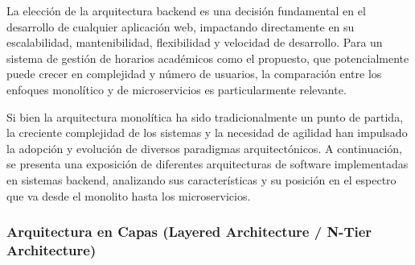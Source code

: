 La elección de la arquitectura backend es una decisión fundamental en el desarrollo de cualquier aplicación web, impactando directamente en su escalabilidad, mantenibilidad, flexibilidad y velocidad de desarrollo. Para un sistema de gestión de horarios académicos como el propuesto, que potencialmente puede crecer en complejidad y número de usuarios, la comparación entre los enfoques monolítico y de microservicios es particularmente relevante.

Si bien la arquitectura monolítica ha sido tradicionalmente un punto de partida, la creciente complejidad de los sistemas y la necesidad de agilidad han impulsado la adopción y evolución de diversos paradigmas arquitectónicos. A continuación, se presenta una exposición de diferentes arquitecturas de software \cite{bookORellySoftwareArchitecture} implementadas en sistemas backend, analizando sus características y su posición en el espectro que va desde el monolito hasta los microservicios.

\subsubsection*{Arquitectura en Capas (Layered Architecture / N-Tier Architecture) \cite{clean_architecture}}

